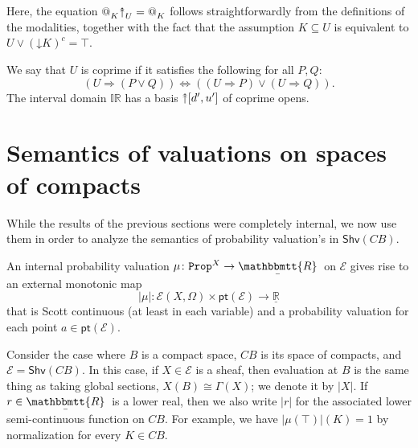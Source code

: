 \documentclass[11pt, oneside, article]{memoir}
\makeatletter
\theoremstyle{plain}
\theoremstyle{definition}
\theoremstyle{remark}
\newcommand{\const}[1]{\mathtt{#1}}
\newcommand{\cat}[1]{\mathcal{#1}}
\newcommand{\Fun}[1]{\mathsf{#1}}
\newcommand{\ul}[1]{\underline{#1}}
\newcommand{\ubar}[1]{\underaccent{\bar}{#1}}
\newcommand{\internal}[1]{\raisebox{-.03ex}{$\mathbbmtt{#1}$}}
\newcommand{\hs}{\hspace{1.1pt}}
\newcommand{\IR}{\mathbb{IR}} %
\newcommand{\LR}{\ul{\mathbb{R}}}
\newcommand{\tRR}{\internal{R}\hs}
\newcommand{\tLR}{\ubar{\tRR}\hs}
\newcommand{\Shv}{\Fun{Shv}}
\newcommand{\Prop}{\const{Prop}}
\newcommand{\pt}{\Fun{pt}}
\newcommand{\BaseSpace}{B}
\newcommand{\AtSymbol}{{@}}
\newcommand{\InSymbol}{{\upclose}}%
\newcommand{\At}[2][]{\AtSymbol^{#1}_{#2}}
\newcommand{\In}[2][]{\InSymbol^{#1}_{#2}}
\newcommand{\upclose}{{\rotatebox[origin=c]{90}{$\twoheadrightarrow$}}}
\newcommand{\down}{\mathord{\downarrow}}
\newcommand{\imp}{\Rightarrow}
\renewcommand{\iff}{\Leftrightarrow}
\makeatother
\begin{document}
Here, the equation $\At{K}\In{U} = \At{K}$ follows straightforwardly from the definitions of the modalities, together with the fact that the assumption $K\subseteq U$ is equivalent to $U \lor (\down K)^c = \top$.

We say that $U$ is coprime if it satisfies the following for all $P,Q$:
\[(U\imp (P\vee Q))\iff((U\imp P)\vee(U\imp Q)).\]
The interval domain $\IR$ has a basis $\upclose[d',u']$ of coprime opens. 







\chapter{Semantics of valuations on spaces of compacts}

While the results of the previous sections were completely internal, we now use them in order to analyze the semantics of probability valuation's in $\Shv(C\BaseSpace)$.

An internal probability valuation $\mu\colon\Prop^X\to\tLR$ on $\cat{E}$ gives rise to an external monotonic map
\[|\mu|\colon\cat{E}(X,\Omega)\times\pt(\cat{E})\to\LR\]
that is Scott continuous (at least in each variable) and a probability valuation for each point $a\in\pt(\cat{E})$.


Consider the case where $\BaseSpace$ is a compact space, $C\BaseSpace$ is its space of compacts, and $\cat{E}=\Shv(C\BaseSpace)$. In this case, if $X\in\cat{E}$ is a sheaf, then evaluation at $\BaseSpace$ is the same thing as taking global sections, $X(\BaseSpace)\cong\Gamma(X)$; we denote it by $|X|$. If $r\in\tLR$ is a lower real, then we also write $|r|$ for the associated lower semi-continuous function on $C\BaseSpace$. For example, we have $|\mu(\top)|(K) = 1$ by normalization for every $K\in C\BaseSpace$.
\end{document}
